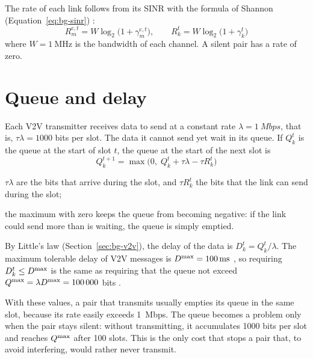 The rate of each link follows from its \ac{SINR} with the formula of Shannon
(Equation~\ref{eq:bg-sinr}) \cite[Eq.~8]{li+22fedmarl}:
\begin{equation}
  R_m^{\mathrm{c},t} = W \log_2\bigl(1 + \gamma_m^{\mathrm{c},t}\bigr), \qquad
  R_k^t = W \log_2\bigl(1 + \gamma_k^t\bigr)
  \label{eq:sm-rates}
\end{equation}
where $W = \SI{1}{\mega\hertz}$ is the bandwidth of each channel. A silent pair has a rate of zero.

\section{Queue and delay}
\label{sec:sm-queue}

Each \ac{V2V} transmitter receives data to send at a constant rate $\lambda = \SI{1}{Mbps}$, that is,
$\tau\lambda = 1000$ bits per slot. The data it cannot send yet wait in its queue. If $Q_k^t$ is the queue at
the start of slot $t$, the queue at the start of the next slot is \cite[Eq.~16]{li+22fedmarl}
\begin{equation}
  Q_k^{t+1} = \max\bigl(0,\; Q_k^t + \tau \lambda - \tau R_k^t \bigr)
  \label{eq:sm-queue}
\end{equation}
\begin{wherelist}
  \item $\tau\lambda$ are the bits that arrive during the slot, and $\tau R_k^t$ the bits that the link can
    send during the slot;
  \item the maximum with zero keeps the queue from becoming negative: if the link could send more than is
    waiting, the queue is simply emptied.
\end{wherelist}
By Little's law (Section~\ref{sec:bg-v2v}), the delay of the data is $D_k^t = Q_k^t / \lambda$. The maximum
tolerable delay of \ac{V2V} messages is $D^{\mathrm{max}} = \SI{100}{\milli\second}$ \cite{3gpp16v2x}, so requiring
$D_k^t \le D^{\mathrm{max}}$ is the same as requiring that the queue not exceed
$Q^{\mathrm{max}} = \lambda D^{\mathrm{max}} = \num{100000}$ bits \cite[Sec.~II-C]{li+22fedmarl}.

With these values, a pair that transmits usually empties its queue in the same slot, because its rate easily
exceeds \SI{1}{Mbps}. The queue becomes a problem only when the pair stays silent: without transmitting, it
accumulates 1000 bits per slot and reaches $Q^{\mathrm{max}}$ after 100 slots. This is the only cost that stops a pair
that, to avoid interfering, would rather never transmit.

